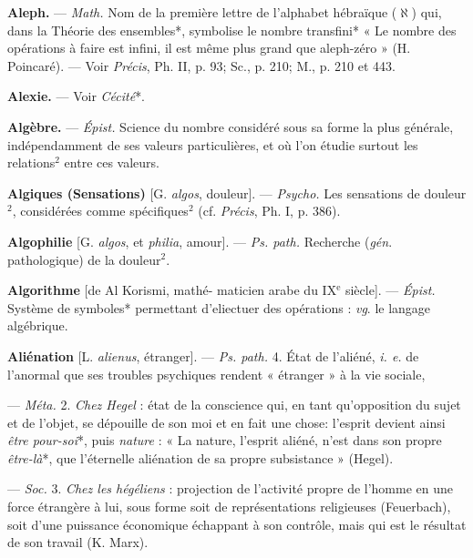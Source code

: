 \begin{itemize}[leftmargin=1cm, label=, itemsep=1pt]
{{\item {\bf Aleph.} — \textsf{\textit {Math.}} Nom de la première
lettre de l'alphabet hébraïque ($\aleph$)
qui, dans la Théorie des ensembles*,
symbolise le nombre transfini*
« Le nombre des opérations à faire
est infini, il est même plus grand
que aleph-zéro » (H. Poincaré). —
Voir {\it Précis}, Ph. II, p. 93; Sc., p. 210;
M., p. 210 et 443.

\item {\bf Alexie.} — Voir {\it Cécité}*.

\item {\bf Algèbre.} — \textsf{\textit {Épist.}} Science du nombre
considéré sous sa forme la plus générale, indépendamment de ses valeurs
particulières, et où l’on étudie surtout les relations$^2$ entre ces valeurs.

\item {\bf Algiques (Sensations)} [G. {\it algos}, douleur]. — \textsf{\textit {Psycho.}} Les sensations de
douleur$^2$, considérées comme spécifiques$^2$ (cf. {\it Précis}, Ph. I, p. 386).

\item {\bf Algophilie} [G. {\it algos}, et {\it philia}, amour].
— \textsf{\textit {Ps. path.}} Recherche ({\it gén}. pathologique) de la douleur$^2$.

\item {\bf Algorithme} [de Al Korismi, mathé-
maticien arabe du {\footnotesize IX}$^\text{e}$ siècle]. — \textsf{\textit {Épist.}}
Système de symboles* permettant
d’eliectuer des opérations : {\it vg}. le
langage algébrique.

\item {\bf Aliénation} [L. {\it alienus}, étranger]. —
\textsf{\textit {Ps. path.}} 4. État de l’aliéné, {\it i. e.} de
l’anormal que ses troubles psychiques rendent « étranger » à la
vie sociale,

— \textsf{\textit {Méta.}} 2. {\it Chez Hegel} : état de la
conscience qui, en tant qu'opposition du sujet et de l’objet,
se dépouille de son moi et en fait une
chose: l'esprit devient ainsi {\it être
pour-soi}*, puis {\it nature} : « La nature,
l'esprit aliéné, n’est dans son propre
{\it être-là}*, que l’éternelle aliénation de
sa propre subsistance » (Hegel).

— \textsf{\textit {Soc.}} 3. {\it Chez les hégéliens} : projection de l’activité propre de l'homme
en une force étrangère à lui, sous
forme soit de représentations religieuses (Feuerbach), soit d'une
puissance économique échappant à
son contrôle, mais qui est le résultat
de son travail (K. Marx).

}}
\end{itemize}

